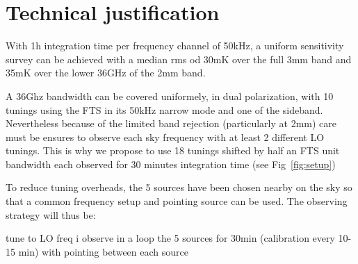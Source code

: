 \section{Technical justification}
With 1h integration time per frequency channel of 50kHz, a uniform sensitivity survey can be achieved with a median rms od 30mK over the full 3mm band and 35mK over the lower 36GHz of the 2mm band. 

A 36Ghz bandwidth can be covered uniformely, in dual polarization, with 10 tunings using the FTS in its 50kHz narrow mode and one of the sideband. Nevertheless because of the limited band rejection (particularly at 2mm) care must be ensures to observe each sky frequency with at least 2 different LO tunings. This is why we propose to use 18 tunings shifted by half an FTS unit bandwidth each observed for 30 minutes integration time (see Fig~\ref{fig:setup})

To reduce tuning overheads, the 5 sources have been chosen nearby on the sky so that a common frequency setup and pointing source can be used. The observing strategy will thus be: 

tune to LO freq i
observe in a loop the 5 sources for 30min (calibration every 10-15 min) with pointing between each source 

   
  
  
  
  
  
  
  